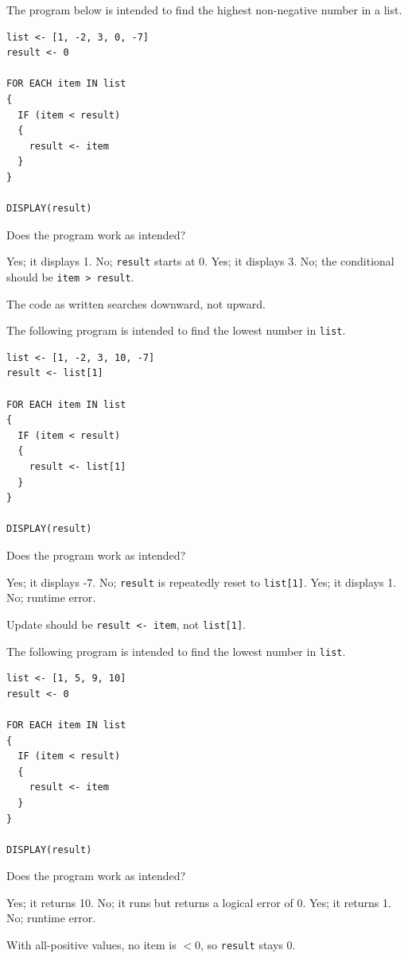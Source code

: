\newpage

\question[5]
The program below is intended to find the highest non-negative number in a list.
\begin{lstlisting}[style=pseudo]
list <- [1, -2, 3, 0, -7]
result <- 0

FOR EACH item IN list
{
  IF (item < result)
  {
    result <- item
  }
}

DISPLAY(result)
\end{lstlisting}
Does the program work as intended?
\begin{choices}
  \choice Yes; it displays 1.
  \choice No; \texttt{result} starts at 0.
  \choice Yes; it displays 3.
  \CorrectChoice No; the conditional should be \texttt{item > result}.
\end{choices}
\begin{solution}
  The code as written searches downward, not upward.
\end{solution}

\question[5]
The following program is intended to find the lowest number in \texttt{list}.
\begin{lstlisting}[style=pseudo]
list <- [1, -2, 3, 10, -7]
result <- list[1]

FOR EACH item IN list
{
  IF (item < result)
  {
    result <- list[1]
  }
}

DISPLAY(result)
\end{lstlisting}
Does the program work as intended?
\begin{choices}
  \choice Yes; it displays -7.
  \CorrectChoice No; \texttt{result} is repeatedly reset to \texttt{list[1]}.
  \choice Yes; it displays 1.
  \choice No; runtime error.
\end{choices}
\begin{solution}
  Update should be \texttt{result <- item}, not \texttt{list[1]}.
\end{solution}

\newpage

\question[5]
The following program is intended to find the lowest number in \texttt{list}.
\begin{lstlisting}[style=pseudo]
list <- [1, 5, 9, 10]
result <- 0

FOR EACH item IN list
{
  IF (item < result)
  {
    result <- item
  }
}

DISPLAY(result)
\end{lstlisting}
Does the program work as intended?
\begin{choices}
  \choice Yes; it returns 10.
  \CorrectChoice No; it runs but returns a logical error of 0.
  \choice Yes; it returns 1.
  \choice No; runtime error.
\end{choices}
\begin{solution}
  With all-positive values, no item is \(< 0\), so \texttt{result} stays 0.
\end{solution}

